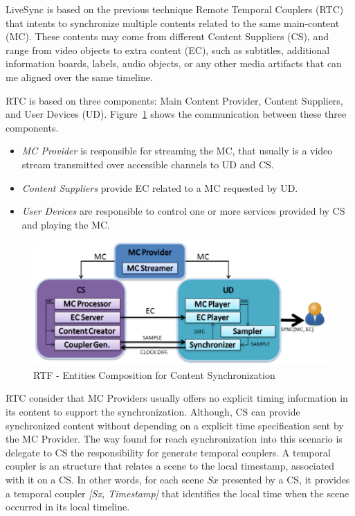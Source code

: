 LiveSync is based on the previous technique Remote Temporal Couplers (RTC) \cite{segundo2015remote} that intents to synchronize multiple contents related to the same main-content (MC). These contents may come from different Content Suppliers (CS), and range from video objects to extra content (EC), such as subtitles, additional information boards, labels, audio objects, or any other media artifacts that can me aligned over the same timeline.

RTC is based on three components: Main Content Provider, Content Suppliers, and User Devices (UD). Figure~\ref{rtc} \cite{segundo2015remote} shows the communication between these three components.

\begin{itemize}

\item \textit{MC Provider} is responsible for streaming the MC, that usually is a video stream transmitted over accessible channels to UD and CS.

\item \textit{Content Suppliers} provide EC related to a MC requested by UD. 

\item \textit{User Devices} are responsible to control one or more services provided by CS and playing the MC.
 
\end{itemize}


\begin{figure}[h!]
	\centering
	\includegraphics[scale=0.4]{figures/rtc}
	\caption{RTF - Entities Composition for Content Synchronization}
	\label{rtc}
\end{figure}

RTC consider that MC Providers usually offers no explicit timing information in its content to support the synchronization. Although, CS can provide synchronized content without depending on a explicit time specification sent by the MC Provider. The way found for reach synchronization into this scenario is delegate to CS the responsibility  for generate temporal couplers. A temporal coupler is an structure that relates a scene to the local timestamp, associated with it on a CS. In other words, for each scene $Sx$ presented by a CS, it provides a temporal coupler \textit{[Sx, Timestamp]} that identifies the local time when the scene occurred in its local timeline.

